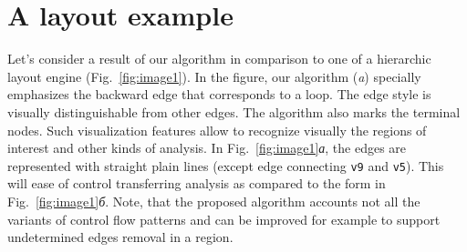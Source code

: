 \documentclass[conference]{IEEEtran}
\begin{document}


\section{A layout example}

Let's consider a result of our algorithm in comparison to one of a hierarchic layout engine (Fig.~\ref{fig:image1}).  In the figure, our algorithm (\emph{a}) specially emphasizes the backward edge that corresponds to a loop.  The edge style is visually distinguishable from other edges.  The algorithm also marks the terminal nodes.  Such visualization features allow to recognize visually the regions of interest and other kinds of analysis.  In Fig.~\ref{fig:image1}\emph{а}, the edges are represented with straight plain lines (except edge connecting \texttt{v9} and \texttt{v5}).  This will ease of control transferring analysis as compared to the form in Fig.~\ref{fig:image1}\emph{б}. Note, that the proposed algorithm accounts not all the variants of control flow patterns and can be improved for example to support undetermined edges removal in a region.
\end{document}
